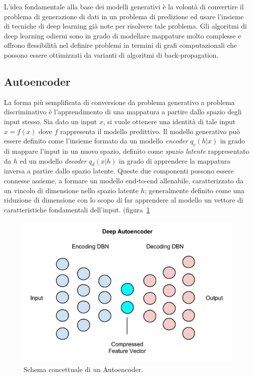 L'idea fondamentale alla base dei modelli generativi è la volontà di convertire il problema di generazione di dati in un problema di predizione ed usare l'insieme di tecniche di deep learning già note per risolvere tale problema. Gli algoritmi di deep learning odierni sono in grado di modellare mappature molto complesse e offrono flessibilità nel definire problemi in termini di grafi computazionali che possono essere ottimizzati da varianti di algoritmi di back-propagation.

\subsection{Autoencoder}
La forma più semplificata di conversione da problema generativo a problema discriminativo è l'apprendimento di una mappatura a partire dallo spazio degli input stesso. Sia dato un input $x$, si vuole ottenere una identità di tale input $x=f(x)$ dove $f$ rappresenta il modello predittivo. Il modello generativo può essere definito come l'insieme formato da un modello \textit{encoder} $q_e(h|x)$ in grado di mappare l'input in un nuovo spazio, definito come \textit{spazio latente} rappresentato da $h$ ed un modello \textit{decoder} $q_d(x|h)$ in grado di apprendere la mappatura inversa a partire dallo spazio latente.
Queste due componenti possono essere connesse assieme, a formare un modello end-to-end allenabile, caratterizzato da un vincolo di dimensione nello spazio latente $h$; generalmente definito come una riduzione di dimensione con lo scopo di far apprendere al modello un vettore di caratteristiche fondamentali dell'input. (figura~\ref{fig:aut}

\begin{figure}[!bp]
	\centering
	\includegraphics[width=\columnwidth]{figures/deep_autoencoder.png}
	\caption{Schema concettuale di un Autoencoder.  \label{fig:aut} }
\end{figure}

